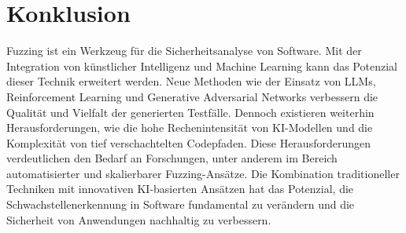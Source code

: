 
\section{Konklusion}\label{sec:konklusion}
Fuzzing ist ein Werkzeug für die Sicherheitsanalyse von Software.
Mit der Integration von künstlicher Intelligenz und Machine Learning kann das Potenzial dieser Technik erweitert werden.
Neue Methoden wie der Einsatz von LLMs, Reinforcement Learning und Generative Adversarial Networks verbessern die Qualität
und Vielfalt der generierten Testfälle.
Dennoch existieren weiterhin Herausforderungen, wie die hohe Rechenintensität von KI-Modellen und die Komplexität von
tief verschachtelten Codepfaden.
Diese Herausforderungen verdeutlichen den Bedarf an Forschungen, unter anderem im Bereich automatisierter und
skalierbarer Fuzzing-Ansätze.
Die Kombination traditioneller Techniken mit innovativen KI-basierten Ansätzen hat das Potenzial, die Schwachstellenerkennung
in Software fundamental zu verändern und die Sicherheit von Anwendungen nachhaltig zu verbessern.
